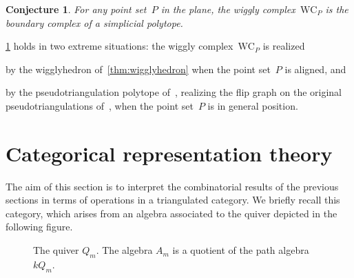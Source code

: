 \documentclass[submission]{FPSAC2025}
\newtheorem{conjecture}[theorem]{Conjecture}
\theoremstyle{definition}
\newcommand{\wigglyComplex}{\mathrm{WC}} %
\begin{document}
\begin{conjecture}
\label{conj:polytopality}
For any point set~$P$ in the plane, the wiggly complex~$\wigglyComplex_P$ is the boundary complex of a simplicial polytope.
\end{conjecture}

\cref{conj:polytopality} holds in two extreme situations: the wiggly complex~$\wigglyComplex_P$ is realized
\begin{compactitem}
\item by the wigglyhedron of~\cref{thm:wigglyhedron} when the point set~$P$ is aligned, and
\item by the pseudotriangulation polytope of~\cite{RoteSantosStreinu-polytope}, realizing the flip graph on the original pseudotriangulations of~\cite{PocchiolaVegter,RoteSantosStreinu-pseudotriangulations}, when the point set~$P$ is in general position.
\end{compactitem}

\newpage
\section{Categorical representation theory}
\label{sec:representationTheory}
The aim of this section is to interpret the combinatorial results of the previous sections in terms of operations in a triangulated category.
We briefly recall this category, which arises from an algebra associated to the quiver depicted in the following figure.
\begin{figure}[h]
  \centering
  \caption{The quiver \(Q_m\). The algebra \(A_m\) is a quotient of the path algebra \(kQ_m\).}
  \label{fig:am-quiver}
\end{figure}
\end{document}
